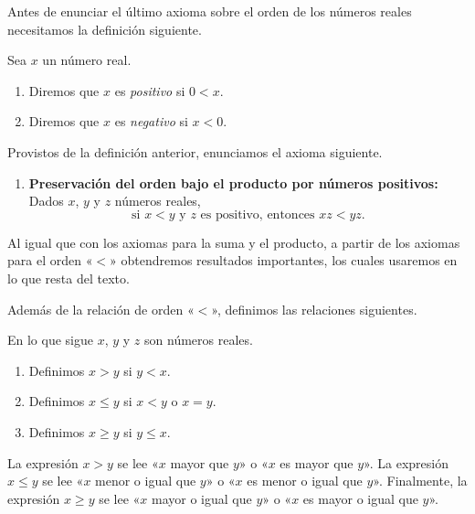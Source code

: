 \documentclass[12pt,a4paper]{book}
\begin{document}
    Antes de enunciar el último axioma sobre el orden de los números reales
    necesitamos la definición siguiente.

    \begin{definicion}\label{def:9}\label{def:positivos}
        Sea $x$ un número real.
        \begin{enumerate}
            \item Diremos que $x$ es \textit{positivo} si $0<x$.
            \item Diremos que $x$ es \textit{negativo} si $x<0$.
        \end{enumerate}
    \end{definicion}

    Provistos de la definición anterior, enunciamos el axioma siguiente.
    \begin{enumerate}[resume*=axiomas]
        \item \textbf{Preservación del orden bajo el producto por números positivos:}
        Dados $x$, $y$ y $z$ números reales,
        \begin{equation*}
            \text{si }x<y\text{ y }z\text{ es positivo, entonces }xz<yz.
        \end{equation*}
    \end{enumerate}

    Al igual que con los axiomas para la suma y el producto, a partir de los
    axiomas para el orden «$<$» obtendremos resultados importantes, los cuales
    usaremos en lo que resta del texto.

    Además de la relación de orden «$<$», definimos las relaciones siguientes.

    \begin{definicion}\label{def:10}\label{def:mayor-que}
        En lo que sigue $x$, $y$ y $z$ son números reales.
        \begin{enumerate}
            \item Definimos $x>y$ si $y<x$.
            \item Definimos $x\leq y$ si $x<y$ o $x=y$.
            \item Definimos $x\geq y$ si $y\leq x$.
        \end{enumerate}
    \end{definicion}

    La expresión $x>y$ se lee «$x$ mayor que $y$» o «$x$ es mayor que $y$». La
    expresión $x\leq y$ se lee «$x$ menor o igual que $y$» o «$x$ es menor o igual que $y$».
    Finalmente, la expresión $x\geq y$ se lee «$x$ mayor o igual que $y$» o «$x$ es mayor
    o igual que $y$».
\end{document}
